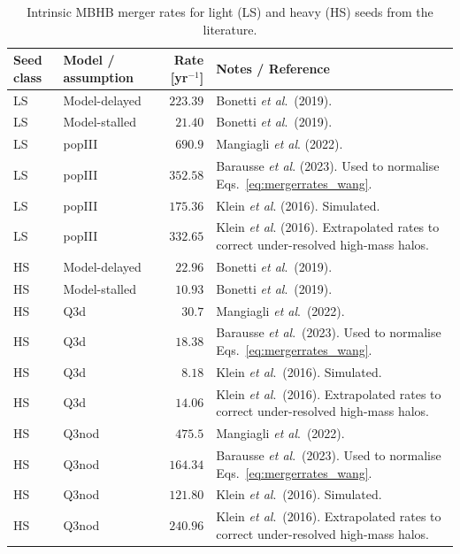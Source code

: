 \documentclass[a4paper,12pt]{article}
\begin{document}
\begin{table}[!htbp]
\captionsetup{font=footnotesize}
\centering
\caption{Intrinsic MBHB merger rates for light (LS) and heavy (HS) seeds from the literature.}
\footnotesize
\setlength{\tabcolsep}{4pt}
\renewcommand\arraystretch{1.12}
\begin{tabular}{@{} l l r p{7.2cm} @{}}
\toprule
Seed class & Model / assumption & Rate [yr$^{-1}$] & Notes / Reference \\
\midrule
LS & Model-delayed         & $223.39$ & Bonetti \textit{et al}.\ (2019). \\
LS & Model-stalled         & $21.40$  & Bonetti \textit{et al}.\ (2019). \\
LS & popIII        & $690.9$ & Mangiagli \textit{et al}. (2022).\\
LS & popIII        & $352.58$ & Barausse \textit{et al}. (2023). Used to normalise Eqs.~\eqref{eq:mergerrates_wang}.\\
LS & popIII        & $175.36$ & Klein \textit{et al}. (2016). Simulated.\\
LS & popIII        & $332.65$ & Klein \textit{et al}. (2016). Extrapolated rates to correct under-resolved high-mass halos. \\
HS & Model-delayed         & $22.96$  & Bonetti \textit{et al}.\ (2019). \\
HS & Model-stalled         & $10.93$  & Bonetti \textit{et al}.\ (2019). \\
HS & Q3d        & $30.7$ & Mangiagli \textit{et al}.\ (2022).\\
HS & Q3d        & $18.38$ & Barausse \textit{et al}.\ (2023). Used to normalise Eqs.~\eqref{eq:mergerrates_wang}.\\
HS & Q3d        & $8.18$ & Klein \textit{et al}.\ (2016). Simulated.\\
HS & Q3d        & $14.06$ & Klein \textit{et al}.\ (2016). Extrapolated rates to correct under-resolved high-mass halos.\\
HS & Q3nod        & $475.5$ & Mangiagli \textit{et al}.\ (2022).\\
HS & Q3nod        & $164.34$ & Barausse \textit{et al}.\ (2023). Used to normalise Eqs.~\ref{eq:mergerrates_wang}.\\
HS & Q3nod        & $121.80$ & Klein \textit{et al}.\ (2016). Simulated.\\
HS & Q3nod        & $240.96$ & Klein \textit{et al}.\ (2016). Extrapolated rates to correct under-resolved high-mass halos.\\
\bottomrule
\end{tabular}
\label{tab:intrinsic_mergerrates_literature}
\end{table}
\end{document}

